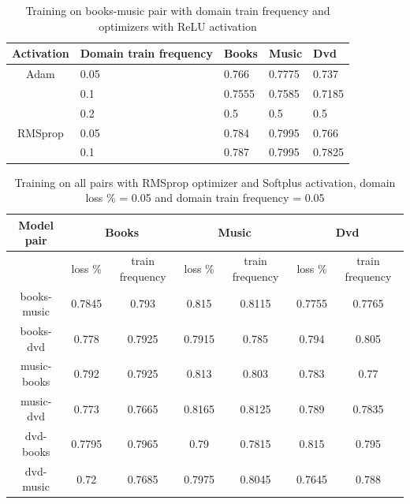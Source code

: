 \documentclass[11pt,a4paper]{article}
\begin{document}
\begin{table}[h]
\begin{center}
\begin{tabular}{|c|l|l|l|l|}
\hline
Activation & \multicolumn{1}{|p{1cm}|}{Domain train frequency}& Books & Music & Dvd \\
\hline
Adam & 0.05 & 0.766 & 0.7775 & 0.737 \\
 & 0.1 & 0.7555 & 0.7585 & 0.7185 \\
 & 0.2 & 0.5 & 0.5 & 0.5 \\
\hline
RMSprop & 0.05 & 0.784 & 0.7995 & 0.766 \\
 & 0.1 & 0.787 & 0.7995 & 0.7825 \\
\hline
\end{tabular}
\end{center}
\caption{ Training on books-music pair with domain train frequency and optimizers with ReLU activation}
\label{1d-optimizer-table}
\end{table}


\begin{table}[t]
\begin{center}
\begin{tabular}{|c|c|c|c|c|c|c|}
\hline
Model pair & \multicolumn{2}{p{1cm}|}{Books} & \multicolumn{2}{p{1cm}|}{Music} & \multicolumn{2}{p{1cm}|}{Dvd} \\
\hline
& \multicolumn{1}{p{1cm}|}{loss \%} & \multicolumn{1}{p{1cm}|}{train frequency} & \multicolumn{1}{p{1cm}|}{loss \%} & \multicolumn{1}{p{1cm}|}{train frequency} & \multicolumn{1}{p{1cm}|}{loss \%} & \multicolumn{1}{p{1cm}|}{train frequency} \\
\hline
books-music & 0.7845 & 0.793 & 0.815 & 0.8115 & 0.7755 & 0.7765 \\
\hline
books-dvd & 0.778 & 0.7925 & 0.7915 & 0.785 & 0.794 & 0.805 \\
\hline
music-books & 0.792 & 0.7925 & 0.813 & 0.803 & 0.783 & 0.77 \\
\hline
music-dvd & 0.773 & 0.7665 & 0.8165 & 0.8125 & 0.789 & 0.7835 \\
\hline
dvd-books & 0.7795 & 0.7965 & 0.79 & 0.7815 & 0.815 & 0.795 \\
\hline
dvd-music & 0.72 & 0.7685 & 0.7975 & 0.8045 & 0.7645 & 0.788 \\
\hline
\end{tabular}
\end{center}
\caption{ Training on all pairs with RMSprop optimizer and Softplus activation, domain loss \% = 0.05 and domain train frequency = 0.05}
\label{final-results-table}
\end{table}
\end{document}
